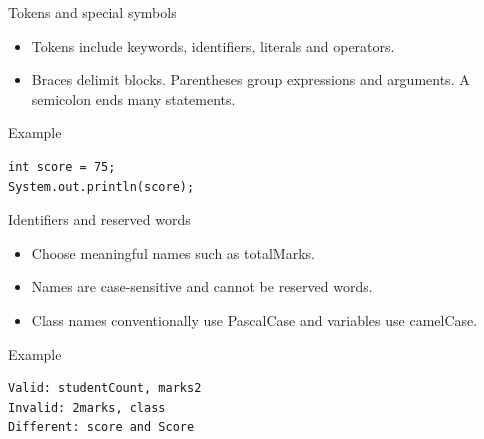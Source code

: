 \documentclass[10pt,aspectratio=169]{beamer}
\begin{document}
\begin{frame}[fragile,t]{Tokens and special symbols}
\begin{itemize}
\item Tokens include keywords, identifiers, literals and operators.
\item Braces delimit blocks. Parentheses group expressions and arguments. A semicolon ends many statements.
\end{itemize}
\vspace{1mm}\begin{block}{Example}
\begin{lstlisting}
int score = 75;
System.out.println(score);
\end{lstlisting}
\end{block}
\end{frame}

\begin{frame}[fragile,t]{Identifiers and reserved words}
\begin{itemize}
\item Choose meaningful names such as totalMarks.
\item Names are case-sensitive and cannot be reserved words.
\item Class names conventionally use PascalCase and variables use camelCase.
\end{itemize}
\vspace{1mm}\begin{block}{Example}
\begin{lstlisting}
Valid: studentCount, marks2
Invalid: 2marks, class
Different: score and Score
\end{lstlisting}
\end{block}
\end{frame}
\end{document}
